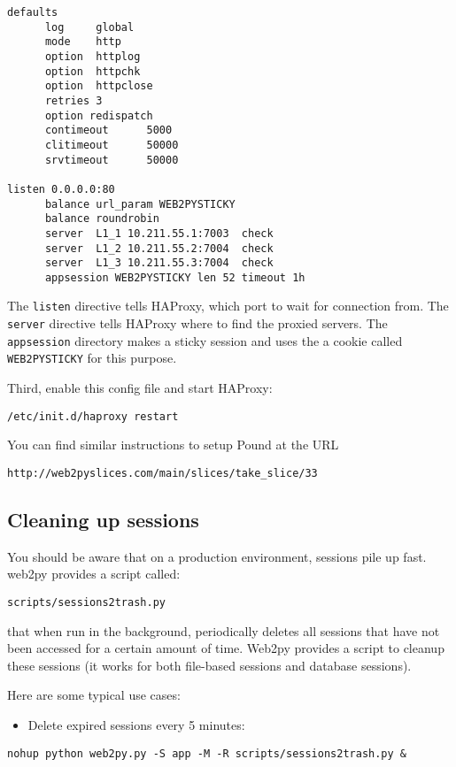 \documentclass[justified,sixbynine,notoc]{tufte-book}
\def\ft{\small\tt}
\begin{document}
\begin{fullwidth}
\begin{lstlisting}
defaults
      log     global
      mode    http
      option  httplog
      option  httpchk
      option  httpclose
      retries 3
      option redispatch
      contimeout      5000
      clitimeout      50000
      srvtimeout      50000

listen 0.0.0.0:80
      balance url_param WEB2PYSTICKY
      balance roundrobin
      server  L1_1 10.211.55.1:7003  check
      server  L1_2 10.211.55.2:7004  check
      server  L1_3 10.211.55.3:7004  check
      appsession WEB2PYSTICKY len 52 timeout 1h
\end{lstlisting}

The {\ft listen} directive tells HAProxy, which port to wait for connection from.
The {\ft server} directive tells HAProxy where to find the proxied servers.
The {\ft appsession} directory makes a sticky session and uses the a cookie called {\ft WEB2PYSTICKY} for this purpose.

Third, enable this config file and start HAProxy:
\begin{lstlisting}
/etc/init.d/haproxy restart
\end{lstlisting}

You can find similar instructions to setup Pound at the URL

\begin{lstlisting}[keywords={}]
http://web2pyslices.com/main/slices/take_slice/33
\end{lstlisting}

\goodbreak\subsection{Cleaning up sessions}

You should be aware that on a production environment, sessions pile up fast. web2py provides a script called:
\begin{lstlisting}
scripts/sessions2trash.py
\end{lstlisting}
\noindent that when run in the background, periodically deletes all sessions that have not been accessed for a certain amount of time. Web2py provides a script to cleanup these sessions (it works for both file-based sessions and database sessions).

Here are some typical use cases:

\begin{itemize}
\item Delete expired sessions every 5 minutes:
\end{itemize}
\begin{lstlisting}
nohup python web2py.py -S app -M -R scripts/sessions2trash.py &
\end{lstlisting}


\end{fullwidth}
\end{document}
